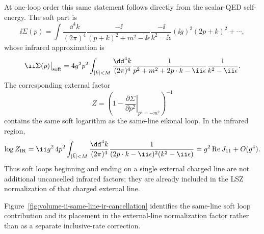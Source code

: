 At one-loop order this same statement follows directly from the scalar-QED
self-energy.  The soft part is
\[
  \ii\Sigma(p)
  =
  \int\frac{\dd^4k}{(2\pi)^4}
  \frac{-\ii}{(p+k)^2+m^2-\ii\epsilon}
  \frac{-\ii}{k^2-\ii\epsilon}
  (\ii g)^2(2p+k)^2+\cdots ,
\]
whose infrared approximation is
\[
  \ii\Sigma(p)\big|_{\rm soft}
  =
  4g^2p^2
  \int_{|\vec k|<M}
  \frac{\dd^4k}{(2\pi)^4}
  \frac{1}{p^2+m^2+2p\cdot k-\ii\epsilon}
  \frac{1}{k^2-\ii\epsilon}.
\]
The corresponding external factor
\[
  Z
  =
  \left(
    1-\left.
    \frac{\partial\Sigma}{\partial p^2}\right|_{p^2=-m^2}
  \right)^{-1}
\]
contains the same soft logarithm as the same-line eikonal loop.  In the
infrared region,
\[
  \log Z_{\rm IR}
  =
  \ii g^2\,4p^2
  \int_{|\vec k|<M}
  \frac{\dd^4k}{(2\pi)^4}
  \frac{1}
       {(2p\cdot k-\ii\epsilon)^2(k^2-\ii\epsilon)}
  =
  g^2\operatorname{Re}J_{11}+O(g^4).
\]
Thus soft loops beginning and ending on a single external charged line are
not additional uncancelled infrared factors; they are already included in
the LSZ normalization of that charged external line.

Figure~\ref{fig:volume-ii-same-line-ir-cancellation} identifies the same-line
soft loop contribution and its placement in the external-line normalization
factor rather than as a separate inclusive-rate correction.

